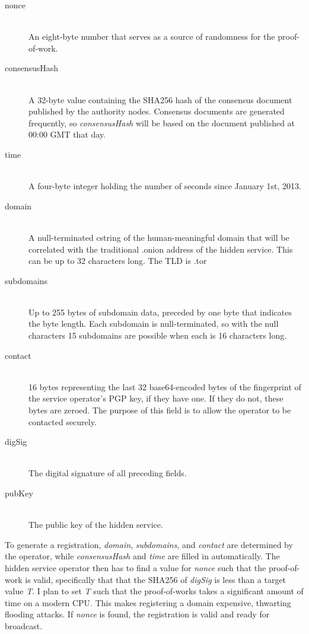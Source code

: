 \begin{description}
	\item[nonce] \hfill \\
		An eight-byte number that serves as a source of randomness for the proof-of-work.
	\item[consensusHash] \hfill \\
		A 32-byte value containing the SHA256 hash of the consensus document published by the authority nodes. Consensus documents are generated frequently, so \textit{consensusHash} will be based on the document published at 00:00 GMT that day.
	\item[time] \hfill \\
		A four-byte integer holding the number of seconds since January 1st, 2013.
	\item[domain] \hfill \\
		A null-terminated cstring of the human-meaningful domain that will be correlated with the traditional .onion address of the hidden service. This can be up to 32 characters long. The TLD is .tor
	\item[subdomains] \hfill \\
		Up to 255 bytes of subdomain data, preceded by one byte that indicates the byte length. Each subdomain is null-terminated, so with the null characters 15 subdomains are possible when each is 16 characters long.
	\item[contact] \hfill \\
		16 bytes representing the last 32 base64-encoded bytes of the fingerprint of the service operator's PGP key, if they have one. If they do not, these bytes are zeroed. The purpose of this field is to allow the operator to be contacted securely.
	\item[digSig] \hfill \\
		The digital signature of all preceding fields.
	\item[pubKey] \hfill \\
		The public key of the hidden service.
\end{description}

To generate a registration, \textit{domain}, \textit{subdomains}, and \textit{contact} are determined by the operator, while \textit{consensusHash} and \textit{time} are filled in automatically. The hidden service operator then has to find a value for \textit{nonce} such that the proof-of-work is valid, specifically that that the SHA256 of \textit{digSig} is less than a target value \textit{T}. I plan to set \textit{T} such that the proof-of-works takes a significant amount of time on a modern CPU. This makes registering a domain expensive, thwarting flooding attacks. If \textit{nonce} is found, the registration is valid and ready for broadcast.

